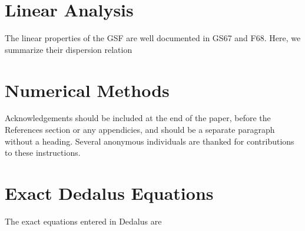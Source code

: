 \documentclass{jfm}
\begin{document}
\section{Linear Analysis}
\label{sec:linear}
The linear properties of the GSF are well documented in GS67 and
F68. Here, we summarize their dispersion relation 

\section{Numerical Methods}
\label{sec:numerical}


Acknowledgements should be included at the end of the paper, before
the References section or any appendicies, and should be a separate
paragraph without a heading. Several anonymous individuals are thanked
for contributions to these instructions.

\appendix
\section{Exact Dedalus Equations}
\label{sec:appendix_dedalus}
The exact equations entered in Dedalus are 



\end{document}
